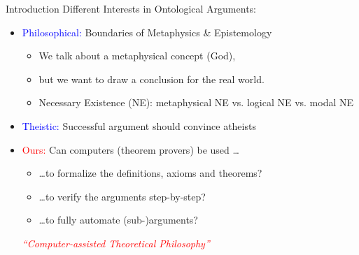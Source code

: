 \begin{frame}{Introduction} \Large
Different Interests in Ontological Arguments: \\[1em]
\begin{itemize}
\item \textcolor{blue}{Philosophical:} Boundaries of Metaphysics \& Epistemology
  \begin{itemize}
  \item We talk about a metaphysical concept (God), 
  \item but we want to draw
      a conclusion for the real world. \\[1em]
  \item Necessary Existence (NE): metaphysical NE vs. logical NE  vs. modal NE \\[2em]
  \end{itemize} 
\item \textcolor{blue}{Theistic:} Successful argument should convince atheists \\[2em]
\item \textcolor{red}{Ours:} Can computers (theorem provers) be used \ldots
  \begin{itemize}
  \item \ldots to formalize the definitions, axioms and theorems?
  \item \ldots to verify the arguments step-by-step?
  \item \ldots to fully automate (sub-)arguments? \\[1em]
  \end{itemize}
  \textcolor{red}{\emph{``Computer-assisted Theoretical Philosophy''}}
\end{itemize}
\end{frame}

